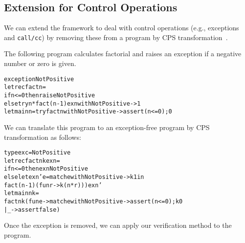 \subsection{Extension for Control Operations}
\label{sec:control} We can extend the framework to deal with control
operations (e.g., exceptions and \texttt{call/cc}) by removing these
from a program by CPS transformation~\cite{Nielsen2001}.

The following program calculates factorial and raises an exception if
a negative number or zero is given.
\begin{alltt}
exception NotPositive
let rec fact n =
  if n <= 0 then raise NotPositive
  else try n * fact (n - 1) exn with NotPositive -> 1
let main n = try fact n with NotPositive -> assert (n <= 0); 0
\end{alltt}
We can translate this program to an exception-free program by CPS transformation as follows:
\begin{alltt}
type exc = NotPositive
let rec fact n k exn =
  if n <= 0 then exn NotPositive
  else let exn' e = match e with NotPositive -> k 1 in
         fact (n - 1) (fun r -> k (n * r))) exn'
let main n k =
  fact n k (fun e -> match e with NotPositive -> assert (n <= 0); k 0
                                | _ -> assert false)
\end{alltt}
Once the exception is removed, we can apply our verification method to the
program.


